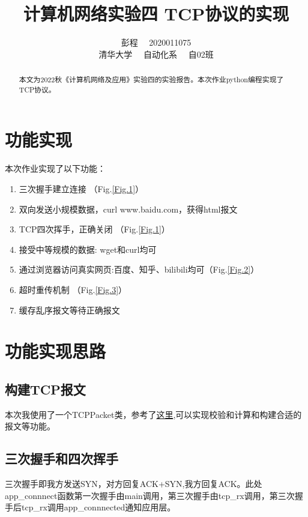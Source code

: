\documentclass[lang=cn,a4paper]{elegantpaper}
\title{计算机网络实验四 TCP协议的实现}
\author{彭程~~ 2020011075 \\ 清华大学~~ 自动化系~~ 自02班}
\date{\zhtoday}
\begin{document}
\maketitle

\begin{abstract}
本文为2022秋《计算机网络及应用》实验四的实验报告。本次作业python编程实现了TCP协议。
\end{abstract}


\section{功能实现}

\noindent 本次作业实现了以下功能：

\begin{enumerate}
  \item 三次握手建立连接 （Fig.\ref{Fig.1}）
  \item 双向发送小规模数据，curl www.baidu.com，获得html报文 
  \item TCP四次挥手，正确关闭 （Fig.\ref{Fig.1}）
  \item 接受中等规模的数据: wget和curl均可
  \item 通过浏览器访问真实网页:百度、知乎、bilibili均可（Fig.\ref{Fig.2}）
  \item 超时重传机制 （Fig.\ref{Fig.3}）
  \item 缓存乱序报文等待正确报文
\end{enumerate}

\section{功能实现思路}

\subsection{构建TCP报文}
本次我使用了一个TCPPacket类，参考了\href{https://kytta.medium.com/tcp-packets-from-scratch-in-python-3a63f0cd59fe}{这里},可以实现校验和计算和构建合适的报文等功能。

\subsection{三次握手和四次挥手}

三次握手即我方发送SYN，对方回复ACK+SYN,我方回复ACK。此处app\_connnect函数第一次握手由main调用，第三次握手由tcp\_rx调用，第三次握手后tcp\_rx调用app\_connnected通知应用层。
\end{document}
